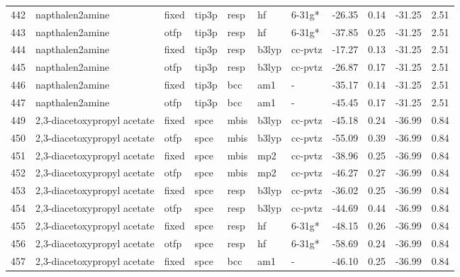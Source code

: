 \begin{tabular}{lllllllrrrr}
442 &               napthalen2amine &  fixed &  tip3p &   resp &      hf &       6-31g* &      -26.35 &     0.14 &      -31.25 &      2.51 \\
443 &               napthalen2amine &   otfp &  tip3p &   resp &      hf &       6-31g* &      -37.85 &     0.25 &      -31.25 &      2.51 \\
444 &               napthalen2amine &  fixed &  tip3p &   resp &   b3lyp &      cc-pvtz &      -17.27 &     0.13 &      -31.25 &      2.51 \\
445 &               napthalen2amine &   otfp &  tip3p &   resp &   b3lyp &      cc-pvtz &      -26.87 &     0.17 &      -31.25 &      2.51 \\
446 &               napthalen2amine &  fixed &  tip3p &    bcc &     am1 &            - &      -35.17 &     0.14 &      -31.25 &      2.51 \\
447 &               napthalen2amine &   otfp &  tip3p &    bcc &     am1 &            - &      -45.45 &     0.17 &      -31.25 &      2.51 \\
449 &   2,3-diacetoxypropyl acetate &  fixed &   spce &   mbis &   b3lyp &      cc-pvtz &      -45.18 &     0.24 &      -36.99 &      0.84 \\
450 &   2,3-diacetoxypropyl acetate &   otfp &   spce &   mbis &   b3lyp &      cc-pvtz &      -55.09 &     0.39 &      -36.99 &      0.84 \\
451 &   2,3-diacetoxypropyl acetate &  fixed &   spce &   mbis &     mp2 &      cc-pvtz &      -38.96 &     0.25 &      -36.99 &      0.84 \\
452 &   2,3-diacetoxypropyl acetate &   otfp &   spce &   mbis &     mp2 &      cc-pvtz &      -46.27 &     0.27 &      -36.99 &      0.84 \\
453 &   2,3-diacetoxypropyl acetate &  fixed &   spce &   resp &   b3lyp &      cc-pvtz &      -36.02 &     0.25 &      -36.99 &      0.84 \\
454 &   2,3-diacetoxypropyl acetate &   otfp &   spce &   resp &   b3lyp &      cc-pvtz &      -44.69 &     0.44 &      -36.99 &      0.84 \\
455 &   2,3-diacetoxypropyl acetate &  fixed &   spce &   resp &      hf &       6-31g* &      -48.15 &     0.26 &      -36.99 &      0.84 \\
456 &   2,3-diacetoxypropyl acetate &   otfp &   spce &   resp &      hf &       6-31g* &      -58.69 &     0.24 &      -36.99 &      0.84 \\
457 &   2,3-diacetoxypropyl acetate &  fixed &   spce &    bcc &     am1 &            - &      -46.10 &     0.25 &      -36.99 &      0.84 \\

\end{tabular}
